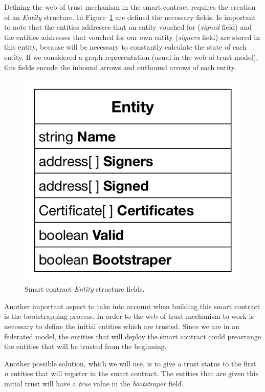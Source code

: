 Defining the web of trust mechanism in the smart contract requires the creation of an \textit{Entity} structure.
In Figure~\ref{fig:entity-structure} are defined the necessary fields.
Is important to note that the entities addresses that an entity vouched for (\textit{signed} field) and the entities addresses that vouched for our own entity (\textit{signers} field) are stored in this entity, because will be necessary to constantly calculate the state of each entity.
If we considered a graph representation (usual in the web of trust model), this fields encode the inbound arrows and outbound arrows of each entity.

\begin{figure}[htb]
  \centering
  \includegraphics[scale=0.5]{Figures/entity-structure.pdf}
  \caption{Smart contract \textit{Entity} structure fields.}
\label{fig:entity-structure}
\end{figure}

Another important aspect to take into account when building this smart contract is the bootstrapping process.
In order to the web of trust mechanism to work is necessary to define the initial entities which are trusted.
Since we are in an federated model, the entities that will deploy the smart contract could prearrange the entities that will be trusted from the beginning.

Another possible solution, which we will use, is to give a trust status to the first \textit{n} entities that will register in the smart contract.
The entities that are given this initial trust will have a \textit{true} value in the \textit{bootstraper} field.

